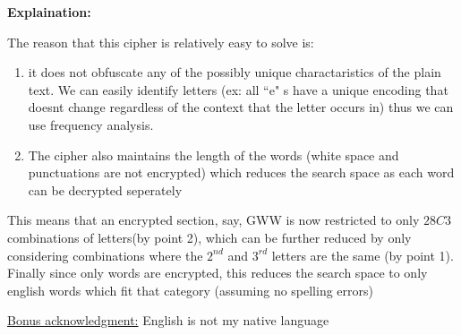 \documentclass{article}
\numberwithin{equation}{subsection}
\begin{document}
	\textbf{Explaination:}
	\par{
		The reason that this cipher is relatively easy to solve is:
		
		\begin{enumerate}
			\item it does not
		obfuscate any of the possibly unique charactaristics of the plain text. We can easily identify
		letters (ex: all ``e" s have a unique encoding that doesnt change regardless
		of the context that the letter occurs in) thus we can use frequency analysis. 
		\item The cipher also 
		maintains the length of the words (white space and punctuations are not encrypted) which reduces
		the search space as each word can be decrypted seperately 		
	\end{enumerate}

	This means that an encrypted section, say, GWW is now restricted to only $28C3$ combinations
	of letters(by point 2), which can be further reduced by only considering 
	combinations where the $2^{nd}$ and $3^{rd}$ letters are the same (by point 1). Finally 
	since only words are encrypted, this reduces the search space to only english words which fit that
	category (assuming no spelling errors)
	}

	\underline{Bonus acknowledgment:} English is not my native language  
\end{document}
